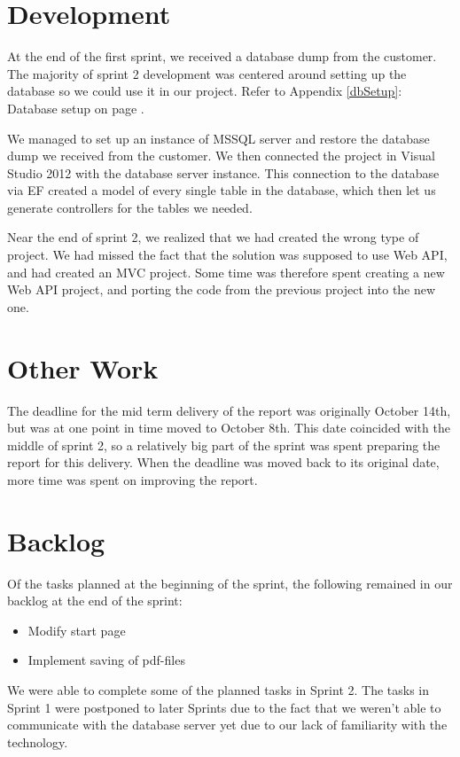 \section{Development}
At the end of the first sprint, we received a database dump from the customer. The majority of sprint 2 development was centered around setting up the database so we could use it in our project. Refer to Appendix \ref{dbSetup}: Database setup on page \pageref{dbSetup}.

We managed to set up an instance of MSSQL server and restore the database dump we received from the customer. We then connected the project in Visual Studio 2012 with the database server instance. This connection to the database via EF created a model of every single table in the database, which then let us generate controllers for the tables we needed.

Near the end of sprint 2, we realized that we had created the wrong type of project. We had missed the fact that the solution was supposed to use Web API, and had created an MVC project. Some time was therefore spent creating a new Web API project, and porting the code from the previous project into the new one.

\section{Other Work}
The deadline for the mid term delivery of the report was originally October 14th, but was at one point in time moved to October 8th. This date coincided with the middle of sprint 2, so a relatively big part of the sprint was spent preparing the report for this delivery. When the deadline was moved back to its original date, more time was spent on improving the report.

\section{Backlog}
Of the tasks planned at the beginning of the sprint, the following remained in our backlog at the end of the sprint:
\begin{itemize}
	\item Modify start page
	\item Implement saving of pdf-files
\end{itemize}
We were able to complete some of the planned tasks in Sprint 2. The tasks in Sprint 1 were postponed to later Sprints due to the fact that we weren't able to communicate with the database server yet due to our lack of familiarity with the technology.

